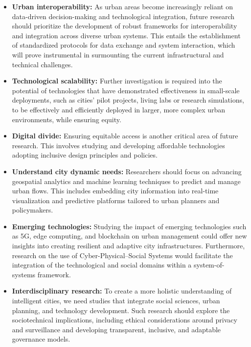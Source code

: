 \documentclass[smartcities,article,submit,pdftex,moreauthors]{Definitions/mdpi}
\begin{document}
\begin{itemize}
    \item \textbf{Urban interoperability:} As urban areas become increasingly reliant on data-driven decision-making and technological integration, future research should prioritize the development of robust frameworks for interoperability and integration across diverse urban systems. This entails the establishment of standardized protocols for data exchange and system interaction, which will prove instrumental in surmounting the current infrastructural and technical challenges.  
    
    \item \textbf{Technological scalability:} Further investigation is required into the potential of technologies that have demonstrated effectiveness in small-scale deployments, such as cities' pilot projects, living labs or research simulations, to be effectively and efficiently deployed in larger, more complex urban environments, while ensuring equity.
    
    \item \textbf{Digital divide:} Ensuring equitable access is another critical area of future research. This involves studying and developing affordable technologies adopting inclusive design principles and policies.

    \item \textbf{Understand city dynamic needs:} Researchers should focus on advancing geospatial analytics and machine learning techniques to predict and manage urban flows. This includes embedding city information into real-time visualization and predictive platforms tailored to urban planners and policymakers. 

    \item \textbf{Emerging technologies:} Studying the impact of emerging technologies such as 5G, edge computing, and blockchain on urban management could offer new insights into creating resilient and adaptive city infrastructures. Furthermore, research on the use of Cyber-Physical–Social Systems would facilitate the integration of the technological and social domains within a system-of-systems framework.

    \item \textbf{Interdisciplinary research:} To create a more holistic understanding of intelligent cities, we need studies that integrate social sciences, urban planning, and technology development. Such research should explore the sociotechnical implications, including ethical considerations around privacy and surveillance and developing transparent, inclusive, and adaptable governance models.
\end{itemize}
\end{document}
